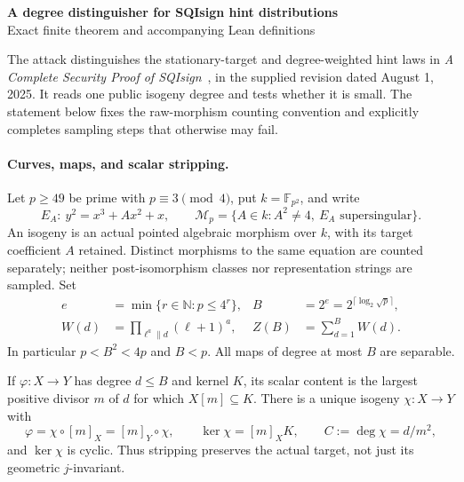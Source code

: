 \documentclass[11pt]{article}
\newcommand{\F}{\mathbb F}
\newcommand{\N}{\mathbb N}
\begin{document}
\begin{center}
{\large\bfseries A degree distinguisher for SQIsign hint distributions}\\[3pt]
{\small Exact finite theorem and accompanying Lean definitions}
\end{center}
\vspace{-0.6em}

The attack distinguishes the stationary-target and degree-weighted hint laws in
\emph{A Complete Security Proof of SQIsign}~\cite{proof}, in the supplied revision dated
August 1, 2025. It reads one public isogeny degree and tests whether it is small.
The statement below fixes the raw-morphism counting convention and explicitly
completes sampling steps that otherwise may fail.

\paragraph{Curves, maps, and scalar stripping.}
Let $p\ge49$ be prime with $p\equiv3\pmod4$, put $k=\F_{p^2}$, and write
\[
 E_A:\ y^2=x^3+Ax^2+x,\qquad
 \mathcal M_p=\{A\in k:A^2\ne4,\ E_A\text{ supersingular}\}.
\]
An isogeny is an actual pointed algebraic morphism over $k$, with its target
coefficient $A$ retained. Distinct morphisms to the same equation are counted
separately; neither post-isomorphism classes nor representation strings are sampled.
Set
\begin{align*}
e&=\min\{r\in\N:p\le4^r\}, &
B&=2^e=2^{\lceil\log_2\sqrt p\rceil},\\
W(d)&=\prod_{\ell^a\parallel d}(\ell+1)^a, &
Z(B)&=\sum_{d=1}^B W(d).
\end{align*}
In particular $p<B^2<4p$ and $B<p$. All maps of degree at most $B$ are separable.

If $\varphi:X\to Y$ has degree $d\le B$ and kernel $K$, its scalar content is the
largest positive divisor $m$ of $d$ for which $X[m]\subseteq K$. There is a unique
isogeny $\chi:X\to Y$ with
\[
 \varphi=\chi\circ[m]_X=[m]_Y\circ\chi,\qquad
 \ker\chi=[m]_X K,\qquad C:=\deg\chi=d/m^2,
\]
and $\ker\chi$ is cyclic. Thus stripping preserves the actual target, not just
its geometric $j$-invariant.
\end{document}
